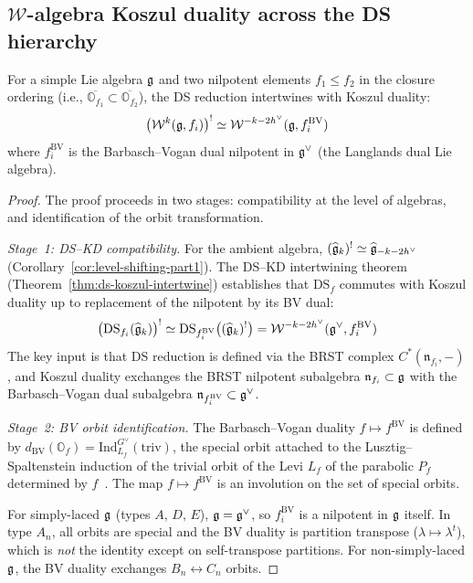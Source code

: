 \subsection{$\mathcal{W}$-algebra Koszul duality across the DS hierarchy}
\label{sec:ds-hierarchy-koszul}

\begin{proposition}
\label{prop:ds-koszul-hierarchy}
For a simple Lie algebra $\mathfrak{g}$ and two nilpotent elements
$f_1 \leq f_2$ in the closure ordering (i.e.,
$\overline{\mathbb{O}_{f_1}} \subset \overline{\mathbb{O}_{f_2}}$),
the DS reduction intertwines with Koszul duality:
\[
\bigl(\mathcal{W}^k(\mathfrak{g}, f_i)\bigr)^!
\simeq \mathcal{W}^{-k-2h^\vee}(\mathfrak{g}, f_i^{\mathrm{BV}})
\]
where $f_i^{\mathrm{BV}}$ is the Barbasch--Vogan dual nilpotent
in $\mathfrak{g}^\vee$ (the Langlands dual Lie algebra).
\end{proposition}

\begin{proof}
The proof proceeds in two stages: compatibility at the level of
algebras, and identification of the orbit transformation.

\emph{Stage~1: DS--KD compatibility.}
For the ambient algebra,
$(\widehat{\mathfrak{g}}_k)^! \simeq \widehat{\mathfrak{g}}_{-k-2h^\vee}$
(Corollary~\ref{cor:level-shifting-part1}).  The DS--KD
intertwining theorem (Theorem~\ref{thm:ds-koszul-intertwine})
establishes that $\mathrm{DS}_f$ commutes with Koszul duality
up to replacement of the nilpotent by its BV dual:
\[
\bigl(\mathrm{DS}_{f_i}(\widehat{\mathfrak{g}}_k)\bigr)^!
\simeq
\mathrm{DS}_{f_i^{\mathrm{BV}}}
\bigl((\widehat{\mathfrak{g}}_k)^!\bigr)
= \mathcal{W}^{-k-2h^\vee}(\mathfrak{g}^\vee, f_i^{\mathrm{BV}})
\]
The key input is that DS reduction is defined via the BRST complex
$C^*(\mathfrak{n}_{f_i}, -)$, and Koszul duality exchanges the BRST
nilpotent subalgebra $\mathfrak{n}_{f_i} \subset \mathfrak{g}$ with the
Barbasch--Vogan dual subalgebra
$\mathfrak{n}_{f_i^{\mathrm{BV}}} \subset \mathfrak{g}^\vee$.

\emph{Stage~2: BV orbit identification.}
The Barbasch--Vogan duality
$f \mapsto f^{\mathrm{BV}}$ is defined by
$d_{\mathrm{BV}}(\mathbb{O}_f)
= \text{Ind}_{L_f}^{G^\vee}(\text{triv})$,
the special orbit attached to the Lusztig--Spaltenstein
induction of the trivial orbit of the Levi $L_f$ of the
parabolic $P_f$ determined by $f$~\cite{BV85,Achar03}.  The map
$f \mapsto f^{\mathrm{BV}}$ is an involution
on the set of special orbits.

For simply-laced $\mathfrak{g}$ (types $A$, $D$, $E$), $\mathfrak{g} = \mathfrak{g}^\vee$,
so $f_i^{\mathrm{BV}}$ is a nilpotent in $\mathfrak{g}$ itself.  In type
$A_n$, all orbits are special and the BV duality is partition
transpose ($\lambda \mapsto \lambda^t$), which is \emph{not}
the identity except on self-transpose partitions.
For non-simply-laced $\mathfrak{g}$, the BV duality exchanges
$B_n \leftrightarrow C_n$ orbits.
\end{proof}

